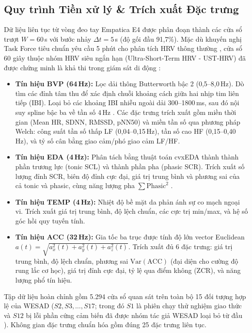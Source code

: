 \documentclass[conference]{IEEEtran}
\begin{document}
\subsection{Quy trình Tiền xử lý \& Trích xuất Đặc trưng}
Dữ liệu liên tục từ vòng đeo tay Empatica E4 được phân đoạn thành các cửa sổ trượt $W = 60$\,s với bước nhảy $\Delta t = 5$\,s (độ gối đầu 91,7\%). Mặc dù khuyến nghị Task Force tiêu chuẩn yêu cầu 5 phút cho phân tích HRV thông thường \cite{taskforce1996heart}, cửa sổ 60 giây thuộc nhóm HRV siêu ngắn hạn (Ultra-Short-Term HRV - UST-HRV) đã được chứng minh là khả thi trong giám sát di động \cite{shaffer2017overview}:
\begin{itemize}
    \item \textbf{Tín hiệu BVP (64\,Hz):} Lọc dải thông Butterworth bậc 2 (0,5--8,0\,Hz). Dò tìm các đỉnh tâm thu để xác định chuỗi khoảng cách giữa hai nhịp tim liên tiếp (IBI). Loại bỏ các khoảng IBI nhiễu ngoài dải 300--1800\,ms, sau đó nội suy spline bậc ba về tần số 4\,Hz \cite{tarvainen2014kubios}. Các đặc trưng trích xuất gồm miền thời gian (Mean HR, SDNN, RMSSD, pNN50) và miền tần số qua phương pháp Welch: công suất tần số thấp LF (0,04--0,15\,Hz), tần số cao HF (0,15--0,40\,Hz), và tỷ số cân bằng giao cảm/phó giao cảm LF/HF.
    \item \textbf{Tín hiệu EDA (4\,Hz):} Phân tách bằng thuật toán cvxEDA \cite{greco2016cvxeda} thành thành phần trương lực (tonic SCL) và thành phần pha (phasic SCR). Trích xuất số lượng đỉnh SCR, biên độ đỉnh cực đại, giá trị trung bình và phương sai của cả tonic và phasic, cùng năng lượng pha $\sum \text{Phasic}^2$ \cite{boucsein2012electrodermal}.
    \item \textbf{Tín hiệu TEMP (4\,Hz):} Nhiệt độ bề mặt da phản ánh sự co mạch ngoại vi. Trích xuất giá trị trung bình, độ lệch chuẩn, các cực trị min/max, và hệ số góc hồi quy tuyến tính.
    \item \textbf{Tín hiệu ACC (32\,Hz):} Gia tốc ba trục được tính độ lớn vector Euclidean $a(t) = \sqrt{a_x^2(t) + a_y^2(t) + a_z^2(t)}$. Trích xuất đủ 6 đặc trưng: giá trị trung bình, độ lệch chuẩn, phương sai $\text{Var}(\text{ACC})$ (đại diện cho cường độ rung lắc cơ học), giá trị đỉnh cực đại, tỷ lệ qua điểm không (ZCR), và năng lượng phổ tín hiệu.
\end{itemize}

Tập dữ liệu hoàn chỉnh gồm 5.294 cửa sổ quan sát trên toàn bộ 15 đối tượng hợp lệ của WESAD ($S2, S3, \dots, S17$; trong đó $S1$ là phiên chạy thử nghiệm giao thức và $S12$ bị lỗi phần cứng cảm biến đã được nhóm tác giả WESAD loại bỏ từ đầu \cite{schmidt2018wesad}). Không gian đặc trưng chuẩn hóa gồm đúng 25 đặc trưng liên tục.
\end{document}
